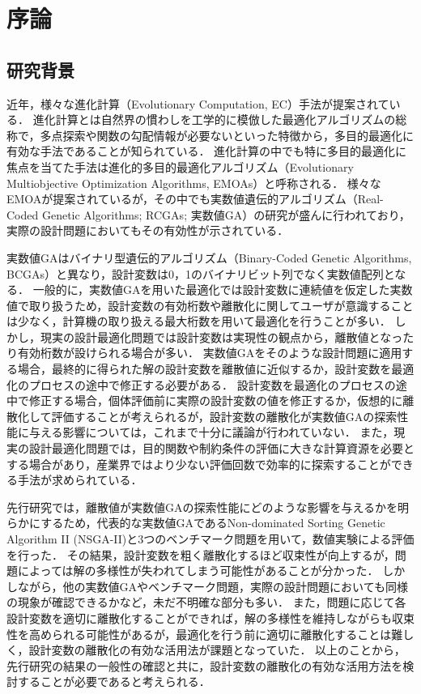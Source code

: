 \documentclass[../main/main]{subfiles}
\begin{document}
\chapter{序論}

\section{研究背景}

\quad 近年，様々な進化計算（Evolutionary Computation, EC）手法が提案されている．
進化計算とは自然界の慣わしを工学的に模倣した最適化アルゴリズムの総称で，多点探索や関数の勾配情報が必要ないといった特徴から，多目的最適化に有効な手法であることが知られている．
進化計算の中でも特に多目的最適化に焦点を当てた手法は進化的多目的最適化アルゴリズム（Evolutionary Multiobjective Optimization Algorithms, EMOAs）と呼称される．
様々なEMOAが提案されているが，その中でも実数値遺伝的アルゴリズム（Real-Coded Genetic Algorithms; RCGAs; 実数値GA）の研究が盛んに行われており，実際の設計問題においてもその有効性が示されている\cite{Chiba2005,Oyama2010}．

実数値GAはバイナリ型遺伝的アルゴリズム（Binary-Coded Genetic Algorithms, BCGAs）と異なり，設計変数は0，1のバイナリビット列でなく実数値配列となる．
一般的に，実数値GAを用いた最適化では設計変数に連続値を仮定した実数値で取り扱うため，設計変数の有効桁数や離散化に関してユーザが意識することは少なく，計算機の取り扱える最大桁数を用いて最適化を行うことが多い．
しかし，現実の設計最適化問題では設計変数は実現性の観点から，離散値となったり有効桁数が設けられる場合が多い．
実数値GAをそのような設計問題に適用する場合，最終的に得られた解の設計変数を離散値に近似するか，設計変数を最適化のプロセスの途中で修正する必要がある．
設計変数を最適化のプロセスの途中で修正する場合，個体評価前に実際の設計変数の値を修正するか，仮想的に離散化して評価することが考えられるが，設計変数の離散化が実数値GAの探索性能に与える影響については，これまで十分に議論が行われていない．
また，現実の設計最適化問題では，目的関数や制約条件の評価に大きな計算資源を必要とする場合があり，産業界ではより少ない評価回数で効率的に探索することができる手法が求められている．

先行研究\cite{近藤2015}では，離散値が実数値GAの探索性能にどのような影響を与えるかを明らかにするため，代表的な実数値GAであるNon-dominated Sorting Genetic Algorithm II (NSGA-II)\cite{Deb2002Fast}と3つのベンチマーク問題を用いて，数値実験による評価を行った．
その結果，設計変数を粗く離散化するほど収束性が向上するが，問題によっては解の多様性が失われてしまう可能性があることが分かった．
しかしながら，他の実数値GAやベンチマーク問題，実際の設計問題においても同様の現象が確認できるかなど，未だ不明確な部分も多い．
また，問題に応じて各設計変数を適切に離散化することができれば，解の多様性を維持しながらも収束性を高められる可能性があるが，最適化を行う前に適切に離散化することは難しく，設計変数の離散化の有効な活用法が課題となっていた．
以上のことから，先行研究の結果の一般性の確認と共に，設計変数の離散化の有効な活用方法を検討することが必要であると考えられる．
\end{document}
